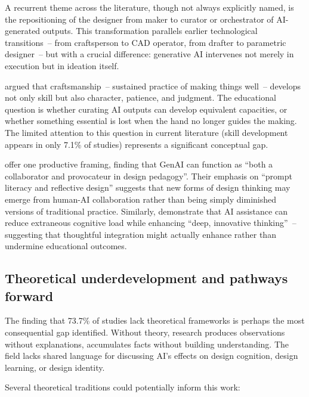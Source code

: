\documentclass[ed]{acnsart}
\begin{document}
A recurrent theme across the literature, though not always explicitly named, is the repositioning of the designer from maker to curator or orchestrator of AI-generated outputs. This transformation parallels earlier technological transitions~-- from craftsperson to CAD operator, from drafter to parametric designer~-- but with a crucial difference: generative AI intervenes not merely in execution but in ideation itself.

\citet{Sennett2008} argued that craftsmanship~-- sustained practice of making things well~-- develops not only skill but also character, patience, and judgment. The educational question is whether curating AI outputs can develop equivalent capacities, or whether something essential is lost when the hand no longer guides the making. The limited attention to this question in current literature (skill development appears in only 7.1\% of studies) represents a significant conceptual gap.

\citet{MedelVera2025} offer one productive framing, finding that GenAI can function as ``both a collaborator and provocateur in design pedagogy''. Their emphasis on ``prompt literacy and reflective design'' suggests that new forms of design thinking may emerge from human-AI collaboration rather than being simply diminished versions of traditional practice. Similarly, \citet{Dong2025} demonstrate that AI assistance can reduce extraneous cognitive load while enhancing ``deep, innovative thinking''~-- suggesting that thoughtful integration might actually enhance rather than undermine educational outcomes.

\subsection{Theoretical underdevelopment and pathways forward}

The finding that 73.7\% of studies lack theoretical frameworks is perhaps the most consequential gap identified. Without theory, research produces observations without explanations, accumulates facts without building understanding. The field lacks shared language for discussing AI's effects on design cognition, design learning, or design identity.

Several theoretical traditions could potentially inform this work:
\end{document}
